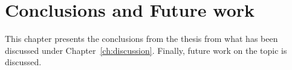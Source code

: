\chapter{Conclusions and Future work}
\label{ch:conclusionsAndFutureWork}
This chapter presents the conclusions from the thesis from what has been discussed under Chapter~\ref{ch:discussion}. Finally, future work on the topic is discussed.



% 

% 



% 